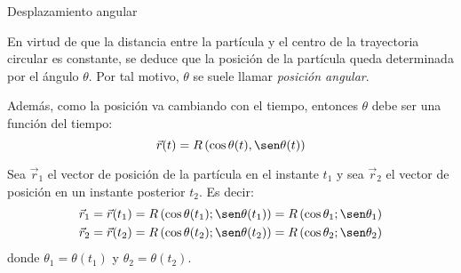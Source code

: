 \documentclass[11pt,handout,aspectratio=1610]{beamer}
\newcommand{\vs}{\vspace{11pt}}
\begin{document}
\begin{frame}{Desplazamiento angular}

    En virtud de que la distancia entre la partícula y el centro de la trayectoria circular es constante, se deduce que la posición de la partícula queda determinada por el ángulo $\theta$. Por tal motivo, $\theta$ se suele llamar \emph{posición angular}.

    \vs 

    Además, como la posición va cambiando con el tiempo, entonces $\theta$ debe ser una función del tiempo: $$\vec{r} (t) = R \left(\cos \theta (t), \sen \theta (t)\right)$$

    Sea $\vec{r}_1$ el vector de posición de la partícula en el instante $t_1$ y sea $\vec{r}_2$ el vector de posición en un instante posterior $t_2$. Es decir:
    \begin{align*}
        \vec{r}_1 &= \vec{r} (t_1) = R \left(\cos \theta (t_1); \sen \theta (t_1)\right) = R \left(\cos \theta_1 ; \sen \theta_1\right) \\
        \vec{r}_2 &= \vec{r} (t_2) = R \left(\cos \theta (t_2); \sen \theta (t_2)\right) = R \left(\cos \theta_2 ; \sen \theta_2\right)
    \end{align*} donde $\theta_1 = \theta (t_1)$ y $\theta_2 = \theta (t_2)$.

    
\end{frame}
\end{document}
